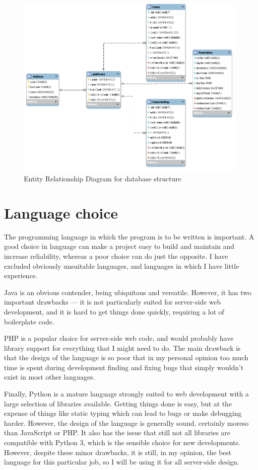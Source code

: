 \documentclass[a4paper,12pt,twoside]{report}
\begin{document}
\begin{figure}[h]
  \centering
  \includegraphics[width=\linewidth]{erd}
  \caption{Entity Relationship Diagram for database structure}
  \label{fig:erd}
\end{figure}

\section{Language choice}

The programming language in which the program is to be written is important. A
good choice in language can make a project easy to build and maintain and
increase reliability, whereas a poor choice can do just the opposite. I have
excluded obviously unsuitable languages, and languages in which I have little
experience.

Java is an obvious contender, being ubiquitous and versatile. However, it has
two important drawbacks --- it is not particularly suited for server-side web
development, and it is hard to get things done quickly, requiring a lot of
boilerplate code.

PHP is a popular choice for server-side web code, and would probably have
library support for everything that I might need to do. The main drawback is
that the design of the language is so poor that in my personal opinion too much
time is spent during development finding and fixing bugs that simply wouldn't
exist in most other languages.

Finally, Python is a mature language strongly suited to web development with a
large selection of libraries available. Getting things done is easy, but at the
expense of things like static typing which can lead to bugs or make debugging
harder. However, the design of the language is generally sound, certainly
moreso than JavaScript or PHP. It also has the issue that still not all
libraries are compatible with Python 3, which is the sensible choice for new
developments. However, despite these minor drawbacks, it is still, in my
opinion, the best language for this particular job, so I will be using it for
all server-side design.
\end{document}
